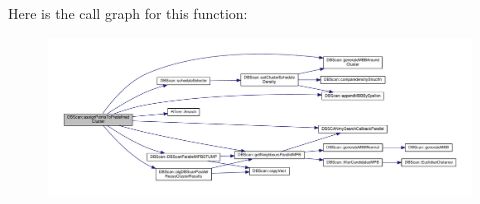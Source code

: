 Here is the call graph for this function\-:\nopagebreak
\begin{figure}[H]
\begin{center}
\leavevmode
\includegraphics[width=350pt]{classDBScan_a31e46e492a6b4a6baa6682f8faf0e2de_cgraph}
\end{center}
\end{figure}



